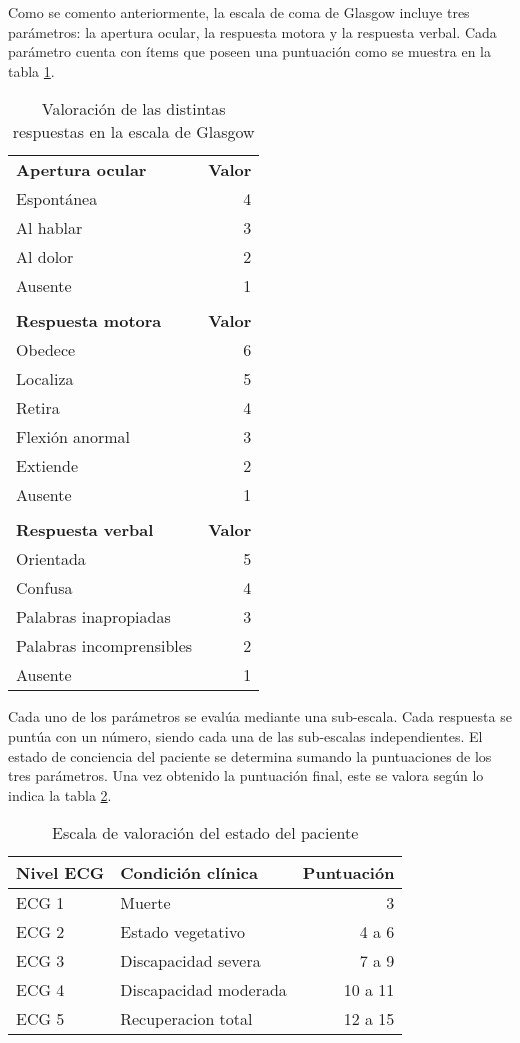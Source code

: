 Como se comento anteriormente, la escala de coma de Glasgow incluye tres parámetros: la apertura ocular, la respuesta motora y la respuesta verbal. Cada parámetro cuenta con ítems que poseen una puntuación como se muestra en la tabla
\ref{tab:seleccion_glasgow_respuestas}. 

\begin{table}[!hbt]
\centering
\begin{tabular}{lr}
\textbf{Apertura ocular} & \textbf{Valor} \\
Espontánea & 4 \\
Al hablar & 3 \\
Al dolor & 2 \\
Ausente & 1 \\
 & \\
\textbf{Respuesta motora} & \textbf{Valor} \\
Obedece & 6 \\
Localiza & 5 \\
Retira & 4 \\
Flexión anormal & 3 \\
Extiende & 2 \\
Ausente & 1 \\
 & \\
\textbf{Respuesta verbal} & \textbf{Valor} \\
Orientada & 5 \\
Confusa & 4 \\
Palabras inapropiadas & 3 \\
Palabras incomprensibles & 2 \\
Ausente & 1 \\
\end{tabular}
\caption{Valoración de las distintas respuestas en la escala de Glasgow}
\label{tab:seleccion_glasgow_respuestas}
\end{table}

Cada uno de los parámetros se evalúa mediante una sub-escala. Cada respuesta se puntúa con un número, siendo cada
una de las sub-escalas independientes. El estado de conciencia del paciente se determina sumando la puntuaciones
de los tres parámetros. Una vez obtenido la puntuación final, este se valora según lo indica la tabla \ref{tab:seleccion_glasgow_estado}.

\begin{table}[!hbt]
\centering
\begin{tabular}{llr}
\toprule
\textbf{Nivel ECG} & 
\textbf{Condición clínica} & 
\textbf{Puntuación} \\ 
\midrule
 ECG 1 & Muerte & 3 \\
 ECG 2 & Estado vegetativo & 4 a 6 \\
 ECG 3 & Discapacidad severa & 7 a 9 \\
 ECG 4 & Discapacidad moderada & 10 a 11 \\
 ECG 5 & Recuperacion total & 12 a 15 \\
\bottomrule
\end{tabular}
\caption{Escala de valoración del estado del paciente}
\label{tab:seleccion_glasgow_estado}
\end{table}

